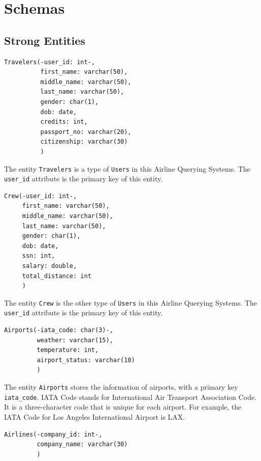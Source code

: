 \documentclass{article}
\begin{document}
	\section{Schemas}
	
	\subsection{Strong Entities}
	\begin{lstlisting}[keepspaces=true]
Travelers(-user_id: int-,
          first_name: varchar(50),
          middle_name: varchar(50),
          last_name: varchar(50),
          gender: char(1),
          dob: date,
          credits: int,
          passport_no: varchar(20), 
          citizenship: varchar(30)
          )
	\end{lstlisting}    
	
	The entity \texttt{Travelers} is a type of \texttt{Users} in this Airline Querying Systems. The 
	\texttt{user\_id} attribute is the primary key of this entity.
	
	\begin{lstlisting}[keepspaces=true]
Crew(-user_id: int-,
     first_name: varchar(50),
     middle_name: varchar(50),
     last_name: varchar(50),
     gender: char(1),
     dob: date,
     ssn: int, 
     salary: double, 
     total_distance: int
     )
	\end{lstlisting}    
	
	The entity \texttt{Crew} is the other type of \texttt{Users} in this Airline Querying Systems. The 
	\texttt{user\_id} attribute is the primary key of this entity.
	
	\begin{lstlisting}[keepspaces=true]
Airports(-iata_code: char(3)-, 
         weather: varchar(15),
         temperature: int,
         airport_status: varchar(10)
         )
	\end{lstlisting}    
	
	The entity \texttt{Airports} stores the information of airports, with a primary key \texttt{iata\_code}. IATA Code stands for International Air Transport Association Code. It is a three-character code that is unique for each airport. For example, the IATA Code for Los Angeles International Airport is LAX.
	
	\begin{lstlisting}[keepspaces=true]             
Airlines(-company_id: int-,
         company_name: varchar(30)
         )
	\end{lstlisting}    
	
\end{document}
